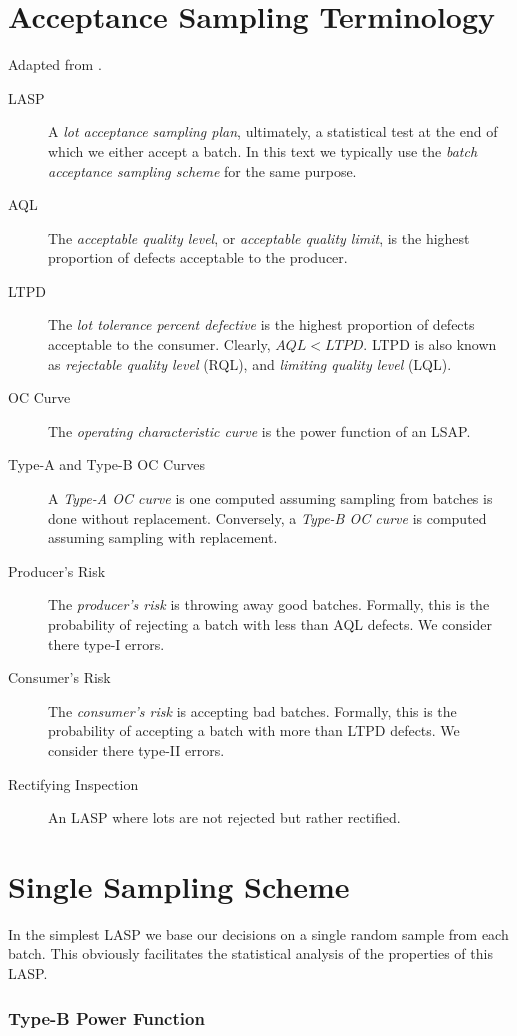 \documentclass[12pt,a4paper]{report}
\theoremstyle{plain}
\theoremstyle{definition}
\begin{document}
\section{Acceptance Sampling Terminology}
Adapted from \cite{natrella_nist/sematech_2010}.
\begin{description}
\item [LASP] A \emph{lot acceptance sampling plan}, ultimately, a statistical test at the end of which we either accept a batch. In this text we typically use the \emph{batch acceptance sampling scheme} for the same purpose. 
\item [AQL] The \emph{acceptable quality level}, or \emph{acceptable quality limit}, is the highest proportion of defects acceptable to the producer. 
\item [LTPD] The \emph{lot tolerance percent defective} is the highest proportion of defects acceptable to the consumer. Clearly, $AQL<LTPD$. LTPD is also known as \emph{rejectable quality level} (RQL), and \emph{ limiting quality level} (LQL). 
\item [OC Curve] The \emph{operating characteristic curve} is the power function of an LSAP.
\item [Type-A and Type-B OC Curves] A \emph{Type-A OC curve} is one computed assuming sampling from batches is done without replacement. Conversely, a \emph{Type-B OC curve} is computed assuming sampling with replacement.
\item [Producer's Risk] The \emph{producer's risk} is throwing away good batches. Formally, this is the probability of rejecting a batch with less than AQL defects. We consider there type-I errors.
\item [Consumer's Risk] The \emph{consumer's risk} is accepting bad batches. Formally, this is the probability of accepting a batch with more than LTPD defects. We consider there type-II errors.
\item [Rectifying Inspection] An LASP where lots are not rejected but rather rectified. 
\end{description}



\section{Single Sampling Scheme}
In the simplest LASP we base our decisions on a single random sample from each batch.
This obviously facilitates the statistical analysis of the properties of this LASP.

\subsubsection{Type-B Power Function}
\end{document}
